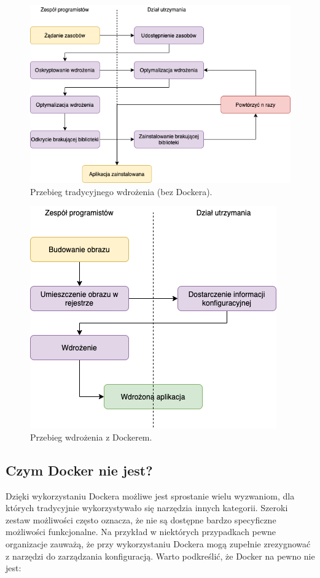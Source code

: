 \begin{figure}[!ht]
\centering
\includegraphics[width=.8\textwidth]{Chapters/Rozwiazanie/docker/proces-without-docker.png}
\caption{Przebieg tradycyjnego wdrożenia (bez Dockera).}
\label{fig:chapter3:proces-without-docker}
\end{figure}

\begin{figure}[!ht]
\centering
\includegraphics[width=.8\textwidth]{Chapters/Rozwiazanie/docker/proces-with-docker.png}
\caption{Przebieg wdrożenia z Dockerem.}
\label{fig:chapter3:proces-with-docker}
\end{figure}


\subsection{Czym Docker nie jest?}
Dzięki wykorzystaniu Dockera możliwe jest sprostanie wielu wyzwaniom, dla których tradycyjnie wykorzystywało się narzędzia innych kategorii. Szeroki zestaw możliwości często oznacza, że nie są dostępne bardzo specyficzne możliwości funkcjonalne. Na przykład w niektórych przypadkach pewne organizacje zauważą, że przy wykorzystaniu Dockera mogą zupełnie zrezygnować z narzędzi do zarządzania konfiguracją. Warto podkreślić, że Docker na pewno nie jest:

